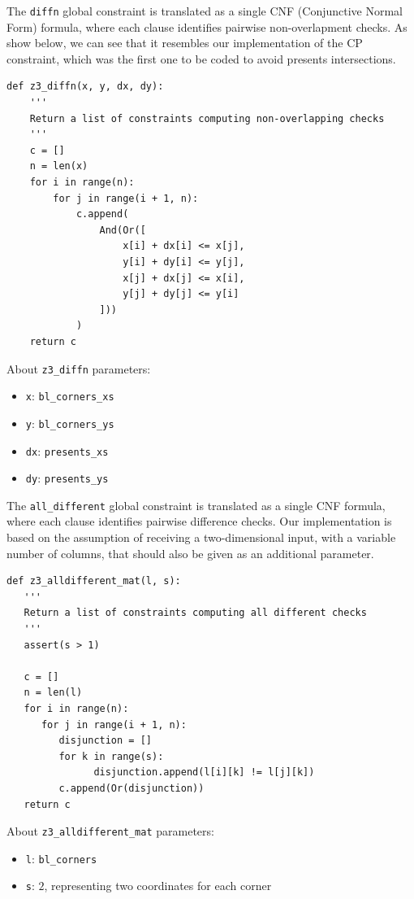 \documentclass[a4paper,10pt]{article}
\newcounter{subsubsubsection}[subsubsection]
\begin{document}
The \texttt{diffn} global constraint is translated as a single CNF (Conjunctive Normal Form) formula, where each clause identifies pairwise non-overlapment checks. As show below, we can see that it resembles our implementation of the  CP constraint, which was the first one to be coded to avoid presents intersections.

\begin{verbatim}
def z3_diffn(x, y, dx, dy):
    '''
    Return a list of constraints computing non-overlapping checks
    '''
    c = []
    n = len(x)
    for i in range(n):
        for j in range(i + 1, n):
            c.append(
                And(Or([
                    x[i] + dx[i] <= x[j],
                    y[i] + dy[i] <= y[j],
                    x[j] + dx[j] <= x[i],
                    y[j] + dy[j] <= y[i]
                ]))
            )
    return c
\end{verbatim}

About \texttt{z3\_diffn} parameters:
\begin{itemize}
   \item \texttt{x}: \texttt{bl\_corners\_xs}
   \item \texttt{y}: \texttt{bl\_corners\_ys}
   \item \texttt{dx}: \texttt{presents\_xs}
   \item \texttt{dy}: \texttt{presents\_ys}
\end{itemize}

The \texttt{all\_different} global constraint is translated as a single CNF formula, where each clause identifies pairwise difference checks. Our implementation is based on the assumption of receiving a two-dimensional input, with a variable number of columns, that should also be given as an additional parameter. 

\begin{verbatim}
def z3_alldifferent_mat(l, s):
   '''
   Return a list of constraints computing all different checks
   '''
   assert(s > 1)
   
   c = []
   n = len(l)
   for i in range(n):
      for j in range(i + 1, n):
         disjunction = []
         for k in range(s):
               disjunction.append(l[i][k] != l[j][k])
         c.append(Or(disjunction))
   return c
\end{verbatim}

About \texttt{z3\_alldifferent\_mat} parameters:
\begin{itemize}
   \item \texttt{l}: \texttt{bl\_corners}
   \item \texttt{s}: $2$, representing two coordinates for each corner
\end{itemize}
\end{document}
